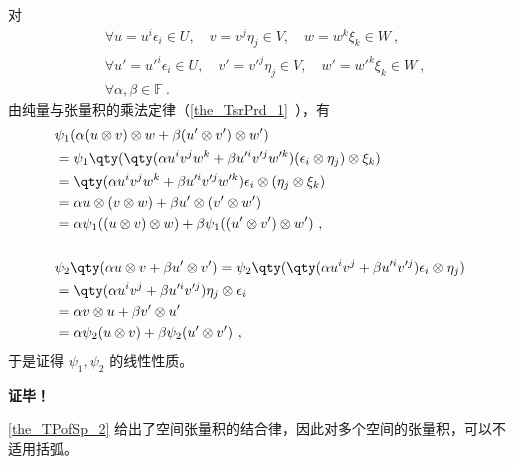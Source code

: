 对
\begin{equation}
\begin{aligned}
&\forall u=u^i\epsilon_i\in U,\quad v=v^j\eta_j\in V,\quad w=w^k\xi_k\in W~,\\
&\forall u'=u'^i\epsilon_i\in U,\quad v'=v'^j\eta_j\in V,\quad w'=w'^k\xi_k\in W~,\\
&\forall \alpha,\beta \in\mathbb F~.
\end{aligned}
\end{equation}
由纯量与张量积的乘法定律（\autoref{the_TsrPrd_1}~），有
\begin{equation}
\begin{aligned}
&\psi_1(\alpha(u\otimes v)\otimes w+\beta(u'\otimes v')\otimes w')\\
&=\psi_1\qty(\qty(\alpha u^iv^jw^k+\beta u'^iv'^jw'^k)(\epsilon_i\otimes\eta_j)\otimes\xi_k)\\
&=\qty(\alpha u^iv^jw^k+\beta u'^iv'^jw'^k)\epsilon_i\otimes(\eta_j\otimes\xi_k)\\
&=\alpha u\otimes (v\otimes w)+\beta u'\otimes (v'\otimes w')\\
&=\alpha\psi_1((u\otimes v)\otimes w)+\beta\psi_1((u'\otimes v')\otimes w')~,\\
\\
&\psi_2\qty(\alpha u\otimes v+\beta u'\otimes v')=\psi_2\qty(\qty(\alpha u^iv^j+\beta u'^iv'^j)\epsilon_i\otimes\eta_j)\\
&=\qty(\alpha u^iv^j+\beta u'^iv'^j)\eta_j\otimes\epsilon_i\\
&=\alpha v\otimes u+\beta v'\otimes u'\\
&=\alpha\psi_2(u\otimes v)+\beta\psi_2(u'\otimes v')~,
\end{aligned}
\end{equation}
于是证得  $\psi_1,\psi_2$ 的线性性质。

\textbf{证毕！}

\autoref{the_TPofSp_2} 给出了空间张量积的结合律，因此对多个空间的张量积，可以不适用括弧。

